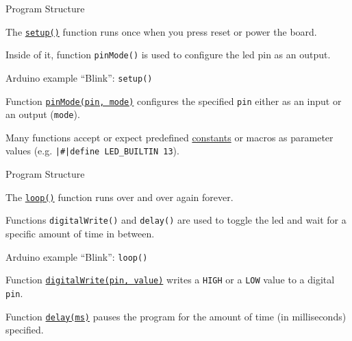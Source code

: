 \documentclass[aspectratio=169]{beamer}
\begin{document}
\begin{frame}{Program Structure}
    \par The \href{https://www.arduino.cc/reference/en/language/structure/sketch/setup/}{\texttt{setup()}} function runs once when you press reset or power the board.
    \par Inside of it, function \texttt{pinMode()} is used to configure the \ac{led} pin as an output.
    \begin{listing}[H]
        \caption{Arduino\textregistered{} example ``Blink'': \texttt{setup()}}
        \label{lst:arduino:blinky:setup}
    \end{listing}
    \vspace{-1em}
    \par Function \href{https://www.arduino.cc/reference/en/language/functions/digital-io/pinmode/}{\texttt{pinMode(pin, mode)}} configures the specified \texttt{pin} either as an input or an output (\texttt{mode}).
    \par Many functions accept or expect predefined \href{https://www.arduino.cc/reference/en/language/variables/constants/constants/}{constants} or macros as parameter values (e.g. \texttt{|\#|define LED_BUILTIN 13}).
\end{frame}

\begin{frame}{Program Structure}
    \par The \href{https://www.arduino.cc/reference/en/language/structure/sketch/loop/}{\texttt{loop()}} function runs over and over again forever.
    \par Functions \texttt{digitalWrite()} and \texttt{delay()} are used to toggle the \acs{led} and wait for a specific amount of time in between.
    \begin{listing}[H]
        \caption{Arduino\textregistered{} example ``Blink'': \texttt{loop()}}
        \label{lst:arduino:blinky:loop}
    \end{listing}
    \vspace{-1em}
    \par Function \href{https://www.arduino.cc/reference/en/language/functions/digital-io/digitalwrite/}{\texttt{digitalWrite(pin, value)}} writes a \texttt{HIGH} or a \texttt{LOW} value to a digital \texttt{pin}.
    \par Function \href{https://www.arduino.cc/reference/en/language/functions/time/delay/}{\texttt{delay(ms)}} pauses the program for the amount of time (in milliseconds) specified.
\end{frame}
\end{document}
